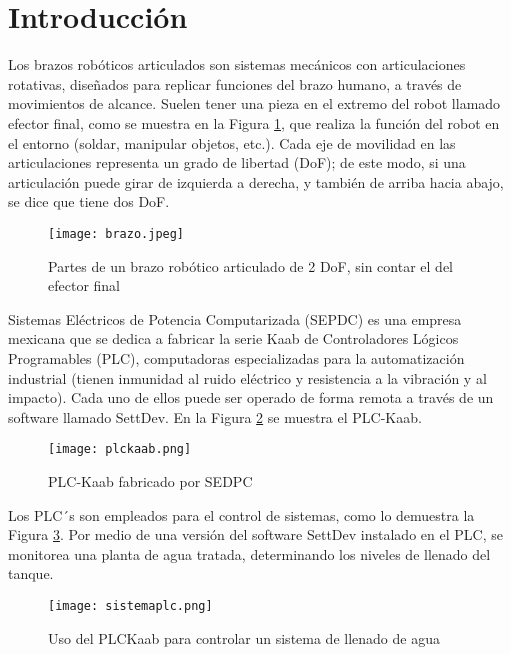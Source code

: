 \section{Introducci\'on}

Los brazos robóticos articulados son sistemas mecánicos con articulaciones rotativas, diseñados para replicar funciones del brazo humano, a través de movimientos de alcance. Suelen tener una pieza en el extremo del robot llamado efector final, como se muestra en la Figura \ref{fig:brazoR}, que realiza la función del robot en el entorno (soldar, manipular objetos, etc.). Cada eje de movilidad en las articulaciones representa un grado de libertad (DoF); de este modo, si una articulación puede girar de izquierda a derecha, y también de arriba hacia abajo, se dice que tiene dos DoF.

\vspace{1cm}

\begin{figure}[htb]
	\centering
	\texttt{[image: brazo.jpeg]}
	\caption{Partes de un brazo robótico articulado de 2 DoF, sin contar el del efector final}
	\label{fig:brazoR}
\end{figure}

\newpage
Sistemas Eléctricos de Potencia Computarizada (SEPDC) es una empresa mexicana que se dedica a fabricar la serie Kaab de Controladores Lógicos Programables (PLC), computadoras especializadas para la automatización industrial (tienen inmunidad al ruido eléctrico y resistencia a la vibración y al impacto). Cada uno de ellos puede ser operado de forma remota a través de un software llamado SettDev. En la Figura \ref{fig:plc} se muestra el PLC-Kaab.

\begin{figure}[htb]
	\centering
	\texttt{[image: plckaab.png]}
	\caption{PLC-Kaab fabricado por SEDPC}
	\label{fig:plc}
\end{figure}

Los PLC´s son empleados para el control de sistemas, como lo demuestra la Figura \ref{fig:siscritico}. Por medio de una versión del software SettDev instalado en el PLC, se monitorea una planta de agua tratada, determinando los niveles de llenado del tanque.

\begin{figure}[htb]
	\centering
	\texttt{[image: sistemaplc.png]}
	\caption{Uso del PLCKaab para controlar un sistema de llenado de agua}
	\label{fig:siscritico}
\end{figure}
